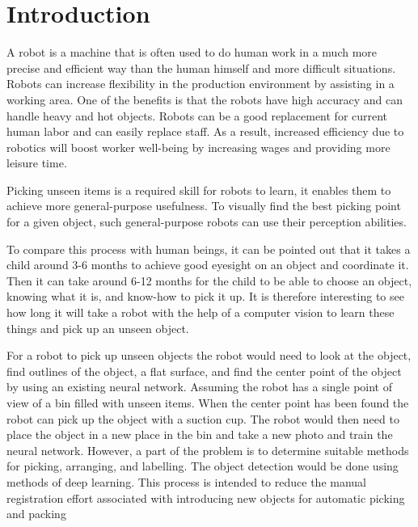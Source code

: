 \chapter{Introduction\label{cha:introduction}}

A robot is a machine that is often used to do human work in a much more precise and efficient way than the human himself and more difficult situations. Robots can increase flexibility in the production environment by assisting in a working area. One of the benefits is that the robots have high accuracy and can handle heavy and hot objects. Robots can be a good replacement for current human labor and can easily replace staff. As a result, increased efficiency due to robotics will boost worker well-being by increasing wages and providing more leisure time.

Picking unseen items is a required skill for robots to learn, it enables them to achieve more general-purpose usefulness. To visually find the best picking point for a given object, such general-purpose robots can use their perception abilities.

To compare this process with human beings, it can be pointed out that it takes a child around 3-6 months to achieve good eyesight on an object and coordinate it. Then it can take around 6-12 months for the child to be able to choose an object, knowing what it is, and know-how to pick it up. It is therefore interesting to see how long it will take a robot with the help of a computer vision to learn these things and pick up an unseen object. 

For a robot to pick up unseen objects the robot would need to look at the object, find outlines of the object, a flat surface, and find the center point of the object by using an existing neural network. Assuming the robot has a single point of view of a bin filled with unseen items. When the center point has been found the robot can pick up the object with a suction cup. The robot would then need to place the object in a new place in the bin and take a new photo and train the neural network. However, a part of the problem is to determine suitable methods for picking, arranging, and labelling. The object detection would be done using methods of deep learning. This process is intended to reduce the manual registration effort associated with introducing new objects for automatic picking and packing


